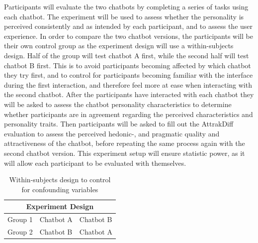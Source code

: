   Participants will evaluate the two chatbots by completing a series of tasks using each chatbot. The experiment will be used to assess whether the personality is perceived consistently and as intended by each participant, and to assess the user experience. In order to compare the two chatbot versions, the participants will be their own control group as the experiment design will use a within-subjects design. Half of the group will test chatbot A first, while the second half will test chatbot B first. This is to avoid participants becoming affected by which chatbot they try first, and to control for participants becoming familiar with the interface during the first interaction, and therefore feel more at ease when interacting with the second chatbot. After the participants have interacted with each chatbot they will be asked to assess the chatbot personality characteristics to determine whether participants are in agreement regarding the perceived characteristics and personality traits. Then participants will be asked to fill out the AttrakDiff evaluation to assess the perceived hedonic-, and pragmatic quality and attractiveness of the chatbot, before repeating the same process again with the second chatbot version. This experiment setup will ensure statistic power, as it will allow each participant to be evaluated with themselves.
   
    \begin{table}[h]
    \begin{tabular}{ |p{3cm}||p{5cm}||p{5cm}| }
    \hline
    \multicolumn{3}{|c|}{Experiment Design} \\
    \hline
    Group 1 &   Chatbot A & Chatbot B \\
    \hline   
    Group 2 &   Chatbot B & Chatbot A \\
    \hline
    \end{tabular}
    \caption{Within-subjects design to control for confounding variables}
    \label{table:4}
    \end{table}
    

